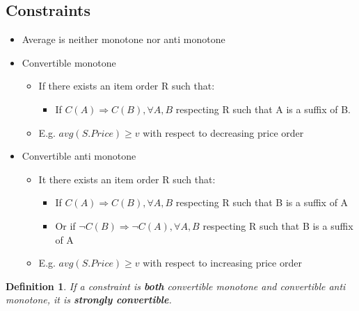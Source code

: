 \documentclass[a4paper]{article}
\newtheorem{definition}{Definition}
\begin{document}
\subsection{Constraints}
\begin{itemize}
		\item Average is neither monotone nor anti monotone
		\item Convertible monotone
				\begin{itemize}
						\item If there exists an item order R such that:
								\begin{itemize}
										\item If $C(A) \Rightarrow C(B), \forall
												A,B$ respecting R such that A is
												a suffix of B.
								\end{itemize}
						\item E.g. $avg(S.Price) \geq v$ with respect to
								decreasing price order
				\end{itemize}
		\item Convertible anti monotone
				\begin{itemize}
						\item It there exists an item order R such that:
								\begin{itemize}
										\item If $C(A) \Rightarrow C(B), \forall
												A,B$ respecting R such that B is
												a suffix of A
										\item Or if $\lnot C(B) \Rightarrow
												\lnot C(A), \forall A,B$
												respecting R such that B is a
												suffix of A
								\end{itemize}
						\item E.g. $avg(S.Price)\geq v$ with respect to
								increasing price order
				\end{itemize}
\end{itemize}
\begin{definition}
		If a constraint is \textbf{both} convertible monotone and convertible
		anti monotone, it is \textbf{strongly convertible}.
\end{definition}
\end{document}
